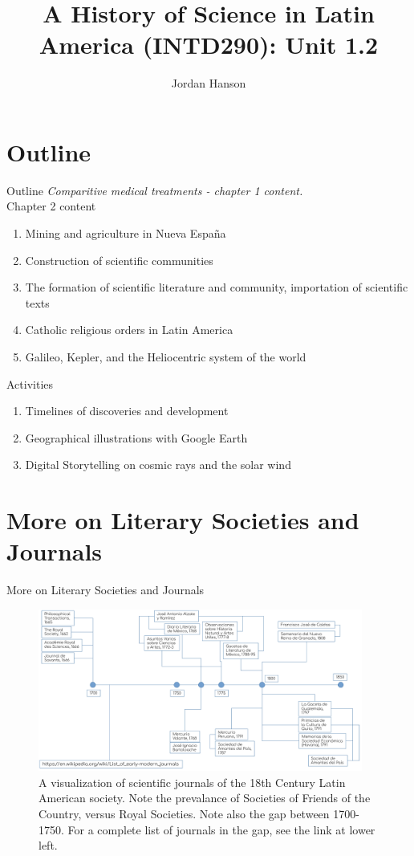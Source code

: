 \documentclass{beamer}
\title{A History of Science in Latin America (INTD290): Unit 1.2}
\author{Jordan Hanson}
\institute{Whittier College Department of Physics and Astronomy}
\begin{document}
\maketitle

\section{Outline}

\begin{frame}{Outline}
\textit{Comparitive medical treatments - chapter 1 content.} \\
\alert{Chapter 2 content}
\begin{enumerate}
\item Mining and agriculture in Nueva Espa\~{n}a
\item Construction of scientific communities
\item The formation of scientific literature and community, importation of scientific texts
\item Catholic religious orders in Latin America
\item Galileo, Kepler, and the Heliocentric system of the world
\end{enumerate}
\alert{Activities}
\begin{enumerate}
\item Timelines of discoveries and development
\item Geographical illustrations with Google Earth
\item Digital Storytelling on cosmic rays and the solar wind
\end{enumerate}
\end{frame}

\section{More on Literary Societies and Journals}

\begin{frame}{More on Literary Societies and Journals}
\small
\begin{figure}
\centering
\includegraphics[width=0.95\textwidth]{figures/TimeLine1.pdf}
\caption{\label{fig:time1} A visualization of scientific journals of the 18th Century Latin American society.  Note the prevalance of Societies of Friends of the Country, versus Royal Societies.  Note also the gap between 1700-1750.  For a complete list of journals in the gap, see the link at lower left.}
\end{figure}
\end{frame}
\end{document}
